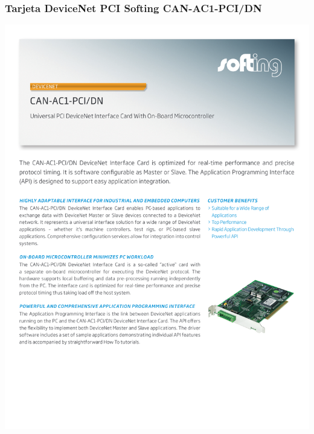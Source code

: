 \subsubsection{Tarjeta DeviceNet PCI Softing CAN-AC1-PCI/DN}
\hspace*{-2cm}
\includegraphics[page=2]{Datasheets/CAN012E2_201204_CAN-AC1_PCI_DN.pdf}
\newpage

